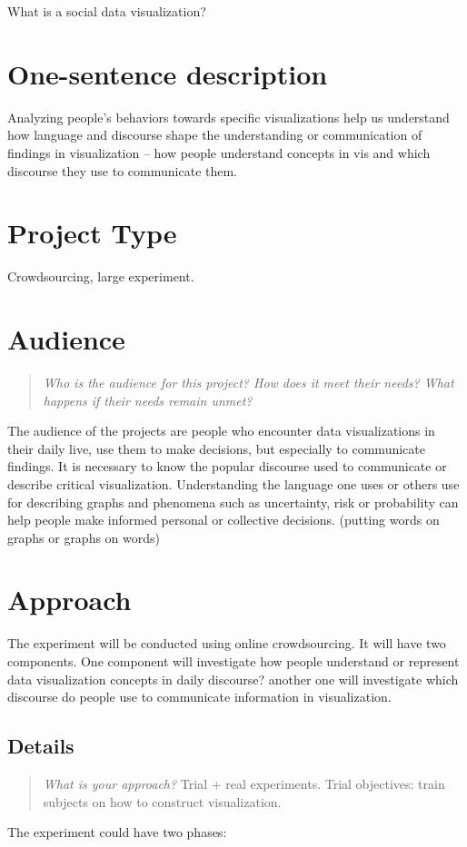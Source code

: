 \documentclass{proc}
\begin{document}
What is a social data visualization? 
\section{One-sentence description}

Analyzing people's behaviors towards specific visualizations help us understand how language and discourse shape the understanding or communication of findings in visualization -- how people understand concepts in vis and which discourse they use to communicate them. 

\section{Project Type}
Crowdsourcing, large experiment.

\section{Audience} 
\begin{quote}
\textit{Who is the audience for this project? 
How does it meet their needs? 
What happens if their needs remain unmet?}
\end{quote}
The audience of the projects are people who encounter data visualizations in their daily live, use them to make decisions, but especially to communicate findings. It is necessary to know the popular discourse used to communicate or describe critical visualization. Understanding the language one uses or others use for describing graphs and phenomena such as uncertainty, risk or probability can help people make informed personal or collective decisions. (putting words on graphs or graphs on words)

\section{Approach}
The experiment will be conducted using online crowdsourcing. 
It will have two components. One component will investigate how people understand or represent data visualization concepts in daily discourse? another one will investigate which discourse do people use to communicate information in visualization. 

\subsection{Details}
\begin{quote}
\textit{What is your approach?}
Trial + real experiments. Trial objectives: train subjects on how to construct visualization.
\end{quote}
The experiment could have two phases: 
\end{document}
